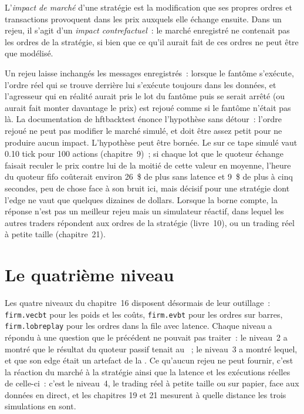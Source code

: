 \begin{definition}\label{def:rs:order-book-replay-simulation:impact}
L'\emph{impact de marché} d'une stratégie est la modification que ses propres ordres et transactions provoquent dans les prix auxquels elle échange ensuite. Dans un rejeu,
il s'agit d'un \emph{impact contrefactuel}~: le marché enregistré ne contenait pas les ordres de la stratégie, si bien que ce qu'il aurait fait
de ces ordres ne peut être que modélisé.
\end{definition}

Un rejeu laisse inchangés les messages enregistrés~: lorsque le fantôme s'exécute, l'ordre réel qui se trouve derrière lui s'exécute toujours dans les données, et l'agresseur qui en
réalité aurait pris le lot du fantôme puis se serait arrêté (ou aurait fait monter davantage le prix) est rejoué comme si le fantôme n'était pas là. La documentation de hftbacktest
énonce l'hypothèse sans détour~: l'ordre rejoué ne peut pas modifier le marché simulé, et doit être assez petit pour ne produire aucun impact.
L'hypothèse peut être bornée. Le  sur ce tape simulé vaut 0.10 tick pour 100 actions (chapitre~9)~; si chaque lot que le quoteur échange faisait reculer le
prix contre lui de la moitié de cette valeur en moyenne, l'heure du quoteur fifo coûterait environ 26~\$ de plus sans latence et 9~\$ de plus à cinq secondes, peu de chose face à son bruit ici,
mais décisif pour une stratégie dont l'edge ne vaut que quelques dizaines de dollars. Lorsque la borne compte, la réponse n'est pas un meilleur rejeu mais un
simulateur réactif, dans lequel les autres traders répondent aux ordres de la stratégie (livre~10), ou un trading réel à petite taille (chapitre~21).

\section{Le quatrième niveau}

Les quatre niveaux du chapitre~16 disposent désormais de leur outillage~: \texttt{firm.vecbt} pour les poids et les coûts, \texttt{firm.evbt} pour les ordres sur barres,
\texttt{firm.lobreplay} pour les ordres dans la file avec latence. Chaque niveau a répondu à une question que le précédent ne pouvait pas traiter~: le niveau~2 a montré que le résultat du quoteur passif tenait au
~; le niveau~3 a montré lequel, et que son edge était un artefact de la . Ce qu'aucun rejeu ne peut fournir, c'est
la réaction du marché à la stratégie ainsi que la latence et les exécutions réelles de celle-ci~: c'est le niveau~4, le trading réel à petite taille ou sur papier, face aux
données en direct, et les chapitres 19 et 21 mesurent à quelle distance les trois simulations en sont.


